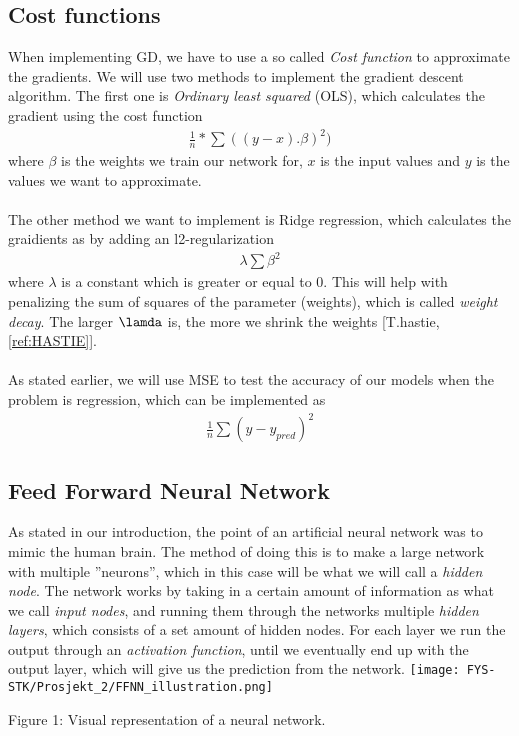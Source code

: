 \documentclass[english,notitlepage,reprint,nofootinbib]{revtex4-1}  %
\begin{document}
\subsection{Cost functions}
When implementing GD, we have to use a so called \textit{Cost function} to approximate the gradients. We will use two methods to implement the gradient descent algorithm. The first one is \textit{Ordinary least squared} (OLS), which calculates the gradient using the cost function
\begin{align*}
    \frac{1}{n}*\sum ((y-x).\beta)^2)
\end{align*}
where $\beta$ is the weights we train our network for, $x$ is the input values and $y$ is the values we want to approximate. 
\\
\\
The other method we want to implement is Ridge regression, which calculates the graidients as by adding an l2-regularization
\begin{align*}
    \lambda \sum \beta^2
\end{align*}
where $\lambda$ is a constant which is greater or equal to $0$. This will help with penalizing the sum of squares of the parameter (weights), which is called \textit{weight decay}. The larger $\lamda$ is, the more we shrink the weights [T.hastie, \ref{ref:HASTIE}].
\\
\\
As stated earlier, we will use MSE to test the accuracy of our models when the problem is regression, which can be implemented as
\begin{align*}
    \frac{1}{n}\sum (y - y_{pred})^2
\end{align*}

\subsection{Feed Forward Neural Network}
As stated in our introduction, the point of an artificial neural network was to mimic the human brain. The method of doing this is to make a large network with multiple ''neurons'', which in this case will be what we will call a \textit{hidden node}. The network works by taking in a certain amount of information as what we call \textit{input nodes}, and running them through the networks multiple \textit{hidden layers}, which consists of a set amount of hidden nodes. For each layer we run the output through an \textit{activation function}, until we eventually end up with the output layer, which will give us the prediction from the network.
\texttt{[image: FYS-STK/Prosjekt\_2/FFNN\_illustration.png]}
\caption{Figure 1: Visual representation of a neural network.}
\end{document}
